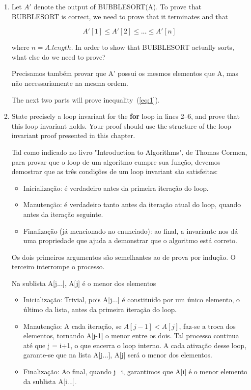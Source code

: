 \documentclass{article}
\begin{document}
	\begin{enumerate}[label=\Alph*]
		\item Let $A'$ denote the output of BUBBLESORT(A). To prove that BUBBLESORT is correct, we need to prove that it terminates and that
		
		\begin{equation} \label{eq:1}
		A'[1] \leq A'[2] \leq ... \leq A'[n]
		\end{equation}
		
		where $n = A.length$. In order to show that BUBBLESORT actually sorts, what else do we need to prove?
		
		Precisamos também provar que A' possui os mesmos elementos que A, mas não necessariamente na mesma ordem.
		
		The next two parts will prove inequality~(\ref{eq:1}).
		
		\item State precisely a loop invariant for the \textbf{for} loop in lines 2–6, and prove that this loop invariant holds. Your proof should use the structure of the loop invariant proof presented in this chapter.
		
		Tal como indicado no livro "Introduction to Algorithms", de Thomas Cormen, para provar que o loop de um algoritmo cumpre sua função, devemos demostrar que as três condições de um loop invariant são satisfeitas:
		\begin{itemize}
			\item Inicialização: é verdadeiro antes da primeira iteração do loop.
			\item Manutenção: é verdadeiro tanto antes da iteração atual do loop, quando antes da iteração seguinte. 
			\item Finalização (já mencionado no enunciado): ao final, a invariante nos dá uma propriedade que ajuda a demonstrar que o algoritmo está correto.
		\end{itemize}
		
		Os dois primeiros argumentos são semelhantes ao de prova por indução. O terceiro interrompe o processo.
		
		Na sublista A[j...], A[j] é o menor dos elementos
		
		\begin{itemize}
			\item Inicialização: Trivial, pois A[j...] é constituído por um único elemento, o último da lista, antes da primeira iteração do loop.
			\item Manutenção: A cada iteração, se $A[j-1] < A[j]$, faz-se a troca dos elementos, tornando A[j-1] o menor entre os dois. Tal processo continua até que j = i+1, o que encerra o loop interno. A cada ativação desse loop, garante-se que na lista A[j...], A[j] será o menor dos elementos.
			\item Finalização: Ao final, quando j=i, garantimos que A[i] é o menor elemento da sublista A[i...].
		\end{itemize}
		

\end{enumerate}
\end{document}
